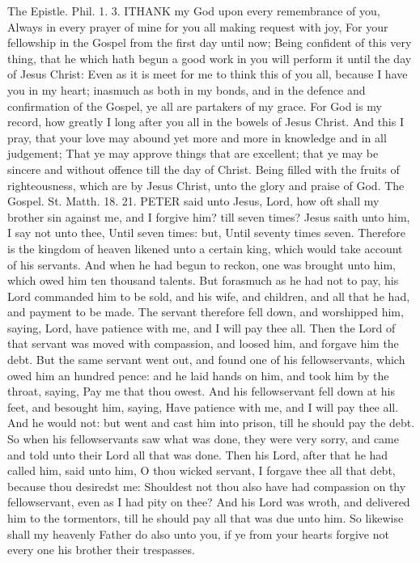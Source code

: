 The Epistle. Phil. 1. 3.
ITHANK my God upon every remembrance of you, Always in every prayer of mine for you all making request with joy, For your fellowship in the Gospel from the first day until now; Being confident of this very thing, that he which hath begun a good work in you will perform it until the day of Jesus Christ: Even as it is meet for me to think this of you all, because I have you in my heart; inasmuch as both in my bonds, and in the defence and confirmation of the Gospel, ye all are partakers of my grace. For God is my record, how greatly I long after you all in the bowels of Jesus Christ. And this I pray, that your love may abound yet more and more in knowledge and in all judgement; That ye may approve things that are excellent; that ye may be sincere and without offence till the day of Christ. Being filled with the fruits of righteousness, which are by Jesus Christ, unto the glory and praise of God.
The Gospel. St. Matth. 18. 21.
PETER said unto Jesus, Lord, how oft shall my brother sin against me, and I forgive him? till seven times? Jesus saith unto him, I say not unto thee, Until seven times: but, Until seventy times seven. Therefore is the kingdom of heaven likened unto a certain king, which would take account of his servants. And when he had begun to reckon, one was brought unto him, which owed him ten thousand talents. But forasmuch as he had not to pay, his Lord commanded him to be sold, and his wife, and children, and all that he had, and payment to be made. The servant therefore fell down, and worshipped him, saying, Lord, have patience with me, and I will pay thee all. Then the Lord of that servant was moved with compassion, and loosed him, and forgave him the debt. But the same servant went out, and found one of his fellowservants, which owed him an hundred pence: and he laid hands on him, and took him by the throat, saying, Pay me that thou owest. And his fellowservant fell down at his feet, and besought him, saying, Have patience with me, and I will pay thee all. And he would not: but went and cast him into prison, till he should pay the debt. So when his fellowservants saw what was done, they were very sorry, and came and told unto their Lord all that was done. Then his Lord, after that he had called him, said unto him, O thou wicked servant, I forgave thee all that debt, because thou desiredst me: Shouldest not thou also have had compassion on thy fellowservant, even as I had pity on thee? And his Lord was wroth, and delivered him to the tormentors, till he should pay all that was due unto him. So likewise shall my heavenly Father do also unto you, if ye from your hearts forgive not every one his brother their trespasses.


